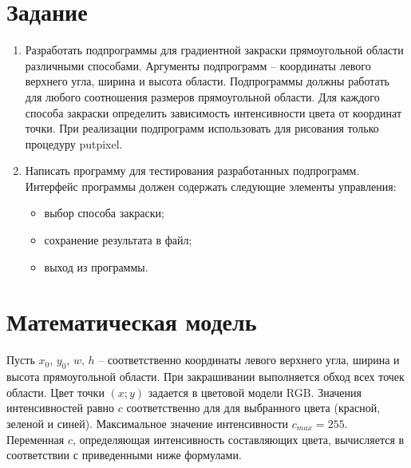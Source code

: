 \documentclass[14pt, a4paper]{extreport}
\begin{document}
\author{Савонин~М.В.}
\maketitle

\chapter{Задание}

\begin{enumerate}

	\item
	Разработать подпрограммы для градиентной закраски прямоугольной области различными способами.
	Аргументы подпрограмм -- координаты левого верхнего угла, ширина и высота области.
	Подпрограммы должны работать для любого соотношения размеров прямоугольной области.
	Для каждого способа закраски определить зависимость интенсивности цвета от координат точки.
	При реализации подпрограмм использовать для рисования только процедуру putpixel.

	\item
	Написать программу для тестирования разработанных \linebreak подпрограмм.
	Интерфейс программы должен содержать следующие элементы управления:
	\begin{itemize}
		\item выбор способа закраски;
		\item сохранение результата в файл;
		\item выход из программы.
	\end{itemize}

\end{enumerate}

\chapter{Математическая модель}

Пусть $x_0$, $y_0$, $w$, $h$ -- соответственно координаты левого верхнего угла, ширина и высота прямоугольной области.
При закрашивании выполняется обход всех точек области.
Цвет точки $(x;y)$ задается в цветовой модели RGB.
Значения интенсивностей равно $c$ соответственно для для выбранного цвета (красной, зеленой и синей).
Максимальное значение интенсивности $c_{max} = 255$.
Переменная $c$, определяющая интенсивность составляющих цвета, вычисляется в соответствии с приведенными ниже формулами.
\end{document}

